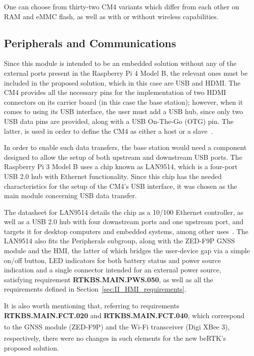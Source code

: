 One can choose from thirty-two CM4 variants which differ from each other on RAM and eMMC flash, as well as with or without wireless capabilities.

\subsection{Peripherals and Communications}\label{sec:312_Peripherals_Communications}

Since this module is intended to be an embedded solution without any of the external ports present in the Raspberry Pi 4 Model B, the relevant ones must be included in the proposed solution, which in this case are USB and HDMI. The CM4 provides all the necessary pins for the implementation of two HDMI connectors on its carrier board (in this case the base station); however, when it comes to using its USB interface, the user must add a USB hub, since only two USB data pins are provided, along with a USB On-The-Go (OTG) pin. The latter, is used in order to define the CM4 as either a host or a slave~\cite{CM4}.


In order to enable such data transfers, the base station would need a component designed to allow the setup of both upstream and downstream USB ports. The Raspberry Pi 3 Model B uses a chip known as LAN9514, which is a four-port USB 2.0 hub with Ethernet functionality. Since this chip has the needed characteristics for the setup of the CM4's USB interface, it was chosen as the main module concerning USB data transfer.

The datasheet for LAN9514 details the chip as a 10/100 Ethernet controller, as well as a USB 2.0 hub with four downstream ports and one upstream port, and targets it for desktop computers and embedded systems, among other uses~\cite{LAN9514}. The LAN9514 also fits the Peripherals subgroup, along with the ZED-F9P GNSS module and the HMI, the latter of which bridges the user-device gap via a simple on/off button, LED indicators for both battery status and power source indication and a single connector intended for an external power source, satisfying requirement \textbf{RTKBS.MAIN.PWS.050}, as well as all the requirements defined in Section~\ref{sec:II_HMI_requirements}.

It is also worth mentioning that, referring to requirements \textbf{RTKBS.MAIN.FCT.020} and \textbf{RTKBS.MAIN.FCT.040}, which correspond to the GNSS module (ZED-F9P) and the Wi-Fi transceiver (Digi XBee\textsuperscript{\textregistered} 3), respectively, there were no changes in such elements for the new beRTK\textsuperscript{\textregistered}'s proposed solution.

